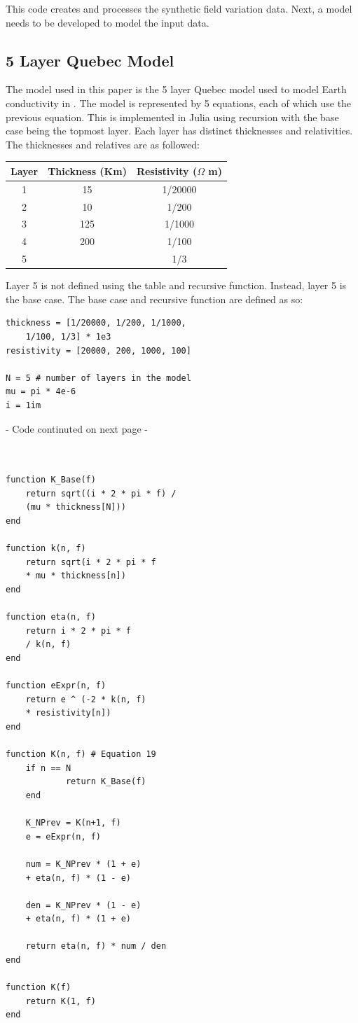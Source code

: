 \documentclass[letterpaper, 12 pt, conference]{ieeeconf}  %
\begin{document}
This code creates and processes the synthetic field variation data. Next, a model needs to be developed to model the input data.

\subsection{5 Layer Quebec Model}
The model used in this paper is the 5 layer Quebec model used to model Earth conductivity in \cite{8859181}. The model is represented by 5 equations, each of which use the previous equation. This is implemented in Julia using recursion with the base case being the topmost layer. Each layer has distinct thicknesses and relativities. The thicknesses and relatives are as followed:

\vspace{1cm}
{\begin{tabular}{|c|c|c|}
\hline
Layer & Thickness (Km) & Resistivity ($\Omega$ m) \\
\hline
1 & 15 & 1/20000 \\
\hline
2 & 10 & 1/200 \\
\hline
3 & 125 & 1/1000 \\
\hline
4 & 200 & 1/100 \\
\hline
5 &  & 1/3 \\
\hline
\end{tabular}}
Layer 5 is not defined using the table and recursive function. Instead, layer 5 is the base case. The base case and recursive function are defined as so:

\begin{lstlisting}[linewidth= \columnwidth]
thickness = [1/20000, 1/200, 1/1000,
    1/100, 1/3] * 1e3
resistivity = [20000, 200, 1000, 100]

N = 5 # number of layers in the model
mu = pi * 4e-6
i = 1im
\end{lstlisting}
- Code continuted on next page -
\begin{lstlisting}


function K_Base(f)
    return sqrt((i * 2 * pi * f) /
    (mu * thickness[N]))
end

function k(n, f)
    return sqrt(i * 2 * pi * f 
    * mu * thickness[n])
end

function eta(n, f)
    return i * 2 * pi * f 
    / k(n, f)
end

function eExpr(n, f)
    return e ^ (-2 * k(n, f)
    * resistivity[n])
end

function K(n, f) # Equation 19
    if n == N
            return K_Base(f)
    end

    K_NPrev = K(n+1, f)
    e = eExpr(n, f)
    
    num = K_NPrev * (1 + e) 
    + eta(n, f) * (1 - e)
    
    den = K_NPrev * (1 - e) 
    + eta(n, f) * (1 + e)
    
    return eta(n, f) * num / den
end

function K(f)
    return K(1, f)
end
    \end{lstlisting}
\end{document}
